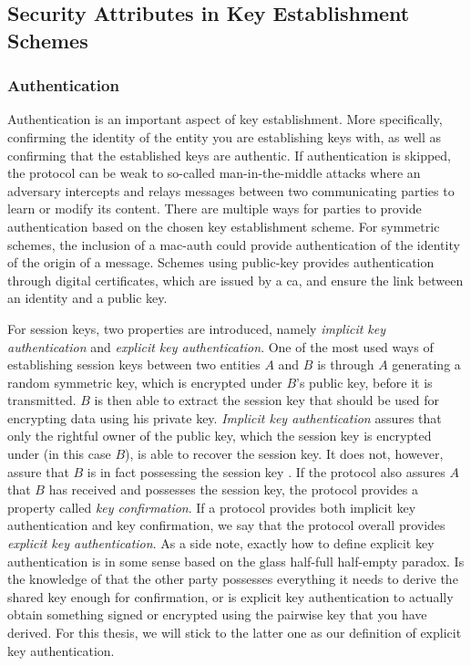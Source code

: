\subsection{Security Attributes in Key Establishment Schemes}
\label{sec:attributes}


\subsubsection{Authentication}

Authentication is an important aspect of key establishment. More specifically, confirming the identity of the entity you are establishing keys with, as well as confirming that the established keys are authentic. If authentication is skipped, the protocol can be weak to so-called man-in-the-middle attacks where an adversary intercepts and relays messages between two communicating parties to learn or modify its content. There are multiple ways for parties to provide authentication based on the chosen key establishment scheme. For symmetric schemes, the inclusion of a \gls{mac-auth} could provide authentication of the identity of the origin of a message. Schemes using public-key provides authentication through digital certificates, which are issued by a \gls{ca}, and ensure the link between an identity and a public key.

For session keys, two properties are introduced, namely \emph{implicit key authentication} and \emph{explicit key authentication}. One of the most used ways of establishing session keys between two entities $A$ and $B$ is through $A$ generating a random symmetric key, which is encrypted under $B$'s public key, before it is transmitted. $B$ is then able to extract the session key that should be used for encrypting data using his private key. \emph{Implicit key authentication} assures that only the rightful owner of the public key, which the session key is encrypted under (in this case $B$), is able to recover the session key. It does not, however, assure that $B$ is in fact possessing the session key \cite{hankerson2006guide}. If the protocol also assures $A$ that $B$ has received and possesses the session key, the protocol provides a property called \emph{key confirmation}. If a protocol provides both implicit key authentication and key confirmation, we say that the protocol overall provides \emph{explicit key authentication}. As a side note, exactly how to define explicit key authentication is in some sense based on the glass half-full half-empty paradox. Is the knowledge of that the other party possesses everything it needs to derive the shared key enough for confirmation, or is explicit key authentication to actually obtain something signed or encrypted using the pairwise key that you have derived. For this thesis, we will stick to the latter one as our definition of explicit key authentication. 


